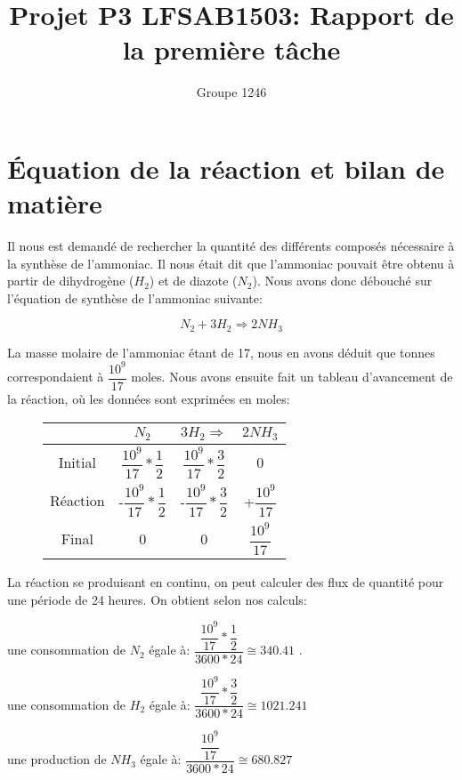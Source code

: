 \documentclass[11pt,a4paper]{report}
\author{Groupe 1246}
\title{Projet P3 LFSAB1503: Rapport de la première tâche}
\begin{document}
\maketitle

\section{Équation de la réaction et bilan de matière}

Il nous est demandé de rechercher la quantité des différents composés nécessaire à la synthèse de l'ammoniac.
Il nous était dit que l'ammoniac pouvait être obtenu à partir de dihydrogène ($H_2$) et de diazote ($N_2$). Nous avons
donc débouché sur l'équation de synthèse de l'ammoniac suivante: 

$$N_2 + 3H_2 \Rightarrow 2NH_3$$

La masse molaire de l'ammoniac étant de \unit{17}{\gram\per\meter}, nous en avons déduit que  tonnes correspondaient à 
$\dfrac{10^{9}}{17}$ moles. Nous avons ensuite fait un tableau d'avancement de la réaction, où les données sont exprimées
en moles: 

\begin{figure}[h]
\begin{tabular}{|c|c|c|c|}
\hline 
 & $N_2$ & $3H_2 \Rightarrow$ & $2NH_3$ \\ 
\hline 
Initial & $\dfrac{10^{9}}{17}*\dfrac{1}{2}$ & $\dfrac{10^{9}}{17}*\dfrac{3}{2}$ & 0 \\ 
\hline 
Réaction & -$\dfrac{10^{9}}{17}*\dfrac{1}{2}$ & -$\dfrac{10^{9}}{17}*\dfrac{3}{2}$ & +$\dfrac{10^{9}}{17}$ \\ 
\hline 
Final & 0 & 0 & $\dfrac{10^{9}}{17}$ \\ 
\hline 
\end{tabular} 
\end{figure}

La réaction se produisant en continu, on peut calculer des flux de quantité pour une période de 24 heures.
On obtient selon nos calculs:

\begin{itemize}
  \item{une consommation de $N_2$ égale à: $\dfrac{\dfrac{10^{9}}{17}*\dfrac{1}{2}}{3600*24} \cong 340.41 $ \unit{}{\mole\per\second}.}
  \item{une consommation de $H_2$ égale à: $\dfrac{\dfrac{10^{9}}{17}*\dfrac{3}{2}}{3600*24} \cong 1021.241 $\unit{}{\mole\per\second}
  \item{une production de $NH_3$ égale à: $\dfrac{\dfrac{10^{9}}{17}}{3600*24} \cong 680.827$ \unit{}{\mole\per\second}
}}\end{itemize}
\end{document}
